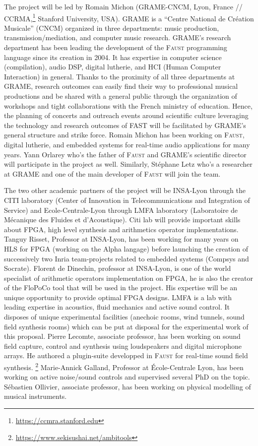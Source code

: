 \documentclass[a4paper,10pt]{article}
\newcommand{\F}{\textsc{Faust}}
\newcommand{\PP}{FAST}
\begin{document}
The project will be led by Romain Michon (GRAME-CNCM, Lyon, France // CCRMA,\footnote{\url{https://ccmra.stanford.edu}} Stanford University, USA). GRAME is a ``Centre National de Création Musicale'' (CNCM) organized in three departments: music production, transmission/mediation, and computer music research. GRAME's research department has been leading the development of the \F{} programming language since its creation in 2004. It has expertise in computer science (compilation), audio DSP, digital lutherie, and HCI (Human Computer Interaction) in general. Thanks to the proximity of all three departments at GRAME, research outcomes can easily find their way to professional musical productions and be shared with a general public through the organization of workshops and tight collaborations with the French ministry of education. Hence, the planning of concerts and outreach events around scientific culture leveraging the technology and research outcomes of \PP{} will be facilitated by GRAME's general structure and strike force. Romain Michon has been working on \F{}, digital lutherie, and embedded systems for real-time audio applications for many years. Yann Orlarey who's the father of \F{} and GRAME's scientific director will participate in the project as well. Similarly, Stéphane Letz who's a researcher at GRAME and one of the main developer of \F{} will join the team. 

The two other academic partners of the project will be INSA-Lyon through  the CITI laboratory (Center of Innovation in Telecommunications and Integration of Service) and Ecole-Centrale-Lyon through LMFA laboratory (Laboratoire de Mécanique des Fluides et d'Acoustique). Citi lab will provide important skills about FPGA, high level synthesis and arithmetics operator implementations. Tanguy Risset, Professor at INSA-Lyon,  has been working for many years on HLS for FPGA (working on the Alpha langage) before launching the creation of successively two Inria team-projects related to embedded systems (Compsys and Socrate). Florent de Dinechin, professor at INSA-Lyon, is one of the world specialist of arithmetic operators implementation on FPGA, he is also the creator of the FloPoCo tool that will be used in the project.  His expertise will be an unique opportunity to provide optimal  FPGA designs. LMFA is a lab with leading expertise in acoustics, fluid mechanics and active sound control. It disposes of unique experimental facilities (anechoic rooms, wind tunnels, sound field synthesis rooms) which can be put at disposal for the experimental work of this proposal. Pierre Lecomte, associate professor, has been working on sound field capture, control and synthesis using loudspeakers and digital microphone arrays. He authored a plugin-suite developped in \F{} for real-time sound field synthesis. \footnote{\url{https://www.sekisushai.net/ambitools}} Marie-Annick Galland, Professor at École-Centrale Lyon, has been working on active noise/sound controls and supervised several PhD on the topic.
Sébastien Ollivier, associate professor, has been working on physical modelling of musical instruments.
\end{document}
